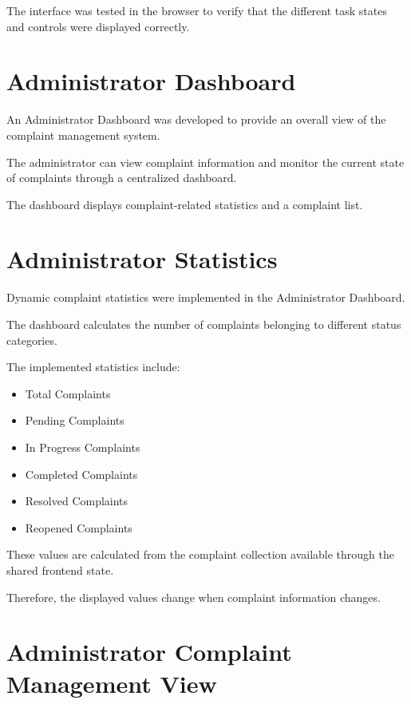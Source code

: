 \documentclass[12pt,a4paper]{article}
\begin{document}
The interface was tested in the browser to verify that the different task
states and controls were displayed correctly.

\section{Administrator Dashboard}

An Administrator Dashboard was developed to provide an overall view of the
complaint management system.

The administrator can view complaint information and monitor the current
state of complaints through a centralized dashboard.

The dashboard displays complaint-related statistics and a complaint list.

\section{Administrator Statistics}

Dynamic complaint statistics were implemented in the Administrator
Dashboard.

The dashboard calculates the number of complaints belonging to different
status categories.

The implemented statistics include:

\begin{itemize}
    \item Total Complaints
    \item Pending Complaints
    \item In Progress Complaints
    \item Completed Complaints
    \item Resolved Complaints
    \item Reopened Complaints
\end{itemize}

These values are calculated from the complaint collection available through
the shared frontend state.

Therefore, the displayed values change when complaint information changes.

\section{Administrator Complaint Management View}
\end{document}
